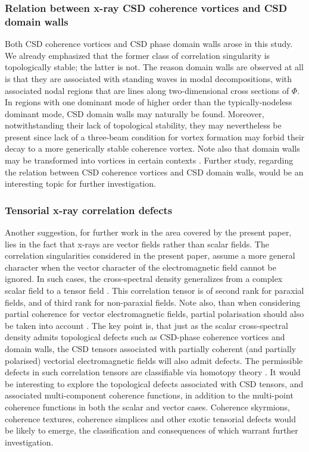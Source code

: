 \documentclass[%
 reprint,
 amsmath,amssymb,
 aps,
]{revtex4-1}
\begin{document}
\subsubsection{Relation between x-ray CSD coherence vortices and CSD domain walls}

Both CSD coherence vortices and CSD phase domain walls arose in this study.  We  already emphasized that the former class of correlation singularity is topologically stable; the latter is not.  The reason  domain walls are observed at all is that they are associated with standing waves in modal decompositions, with associated nodal regions that are lines along two-dimensional cross sections of $\Phi$.  In regions with one dominant mode of higher order than the typically-nodeless dominant mode, CSD domain walls may naturally be found.  Moreover, notwithstanding their lack of topological stability, they may nevertheless be present since lack of a three-beam condition for vortex formation \cite{ThreeBeamCondition, paganin_book} may forbid their decay to a more generically stable coherence vortex.  Note also that domain walls may be transformed into vortices in certain contexts \cite{PaganinOptLett2018}.  Further study, regarding the relation between CSD coherence vortices and CSD domain walls, would be an interesting topic for further investigation.  

\subsubsection{Tensorial x-ray correlation defects} Another suggestion, for further work in the area covered by the present paper, lies in the fact that x-rays are vector fields rather than scalar fields.  The correlation singularities considered in the present paper, assume a more general character when the vector character of the electromagnetic field cannot be ignored.  In such cases, the cross-spectral density generalizes from a complex scalar field to a tensor field \cite{mandel_wolf,wolf_thin_book}.  This correlation tensor is of second rank for paraxial fields, and of third rank for non-paraxial fields.  Note also, than when considering partial coherence for vector electromagnetic fields, partial polarisation should also be taken into account \cite{wolf_thin_book}.  The key point is, that just as the scalar cross-spectral density admits topological defects such as CSD-phase coherence vortices and domain walls, the CSD tensors associated with partially coherent (and partially polarised) vectorial electromagnetic fields will also admit defects.  The permissible defects in such correlation tensors are classifiable via homotopy theory \cite{VilenkinShellard1994,Volovik2003}.  It would be interesting to explore the topological defects associated with CSD tensors, and associated multi-component coherence functions, in addition to the multi-point coherence functions in both the scalar and vector cases.  Coherence skyrmions, coherence textures, coherence simplices \cite{SimulaPaganin2012} and other exotic tensorial defects would be likely to emerge, the classification and consequences of which warrant further investigation.
\end{document}
